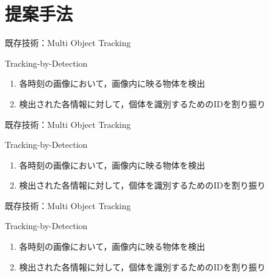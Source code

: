 \section{提案手法}

\begin{frame}{既存技術：Multi Object Tracking}
    \begin{block}{Tracking-by-Detection}
        \begin{enumerate}
            \item 各時刻の画像において，画像内に映る物体を検出
            \item 検出された各情報に対して，個体を識別するためのIDを割り振り
        \end{enumerate}
    \end{block}
\end{frame}
\begin{frame}[noframenumbering]{既存技術：Multi Object Tracking}
    \begin{block}{Tracking-by-Detection}
        \begin{enumerate}
            \item 各時刻の画像において，画像内に映る物体を検出
            \item 検出された各情報に対して，個体を識別するためのIDを割り振り
        \end{enumerate}
    \end{block}
\end{frame}
\begin{frame}[noframenumbering]{既存技術：Multi Object Tracking}
    \begin{block}{Tracking-by-Detection}
        \begin{enumerate}
            \item 各時刻の画像において，画像内に映る物体を検出
            \item 検出された各情報に対して，個体を識別するためのIDを割り振り
        \end{enumerate}
    \end{block}
\end{frame}

